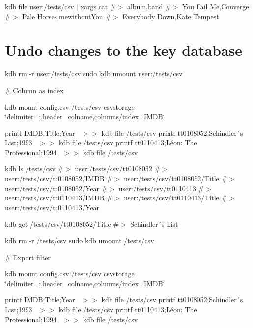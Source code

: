 kdb file user\+:/tests/csv $\vert$ xargs cat \#$>$ album,band \#$>$ You Fail Me,Converge \#$>$ Pale Horses,mewithout\+You \#$>$ Everybody Down,Kate Tempest\hypertarget{autotoc_md122_autotoc_md137}{}\section{Undo changes to the key database}\label{autotoc_md122_autotoc_md137}
kdb rm -\/r user\+:/tests/csv sudo kdb umount user\+:/tests/csv 
\begin{DoxyCode}
# Column as index
\end{DoxyCode}
 kdb mount config.\+csv /tests/csv csvstorage \char`\"{}delimiter=;,header=colname,columns/index=\+I\+M\+D\+B\char`\"{}

printf \textquotesingle{}I\+M\+DB;Title;Year~\newline
\textquotesingle{} $>$$>$ {\ttfamily kdb file /tests/csv} printf \textquotesingle{}tt0108052;Schindler´s List;1993~\newline
\textquotesingle{} $>$$>$ {\ttfamily kdb file /tests/csv} printf \textquotesingle{}tt0110413;Léon\+: The Professional;1994~\newline
\textquotesingle{} $>$$>$ {\ttfamily kdb file /tests/csv}

kdb ls /tests/csv \#$>$ user\+:/tests/csv/tt0108052 \#$>$ user\+:/tests/csv/tt0108052/\+I\+M\+DB \#$>$ user\+:/tests/csv/tt0108052/\+Title \#$>$ user\+:/tests/csv/tt0108052/\+Year \#$>$ user\+:/tests/csv/tt0110413 \#$>$ user\+:/tests/csv/tt0110413/\+I\+M\+DB \#$>$ user\+:/tests/csv/tt0110413/\+Title \#$>$ user\+:/tests/csv/tt0110413/\+Year

kdb get /tests/csv/tt0108052/\+Title \#$>$ Schindler´s List

kdb rm -\/r /tests/csv sudo kdb umount /tests/csv


\begin{DoxyCode}
# Export filter
\end{DoxyCode}
 kdb mount config.\+csv /tests/csv csvstorage \char`\"{}delimiter=;,header=colname,columns/index=\+I\+M\+D\+B\char`\"{}

printf \textquotesingle{}I\+M\+DB;Title;Year~\newline
\textquotesingle{} $>$$>$ {\ttfamily kdb file /tests/csv} printf \textquotesingle{}tt0108052;Schindler´s List;1993~\newline
\textquotesingle{} $>$$>$ {\ttfamily kdb file /tests/csv} printf \textquotesingle{}tt0110413;Léon\+: The Professional;1994~\newline
\textquotesingle{} $>$$>$ {\ttfamily kdb file /tests/csv}

